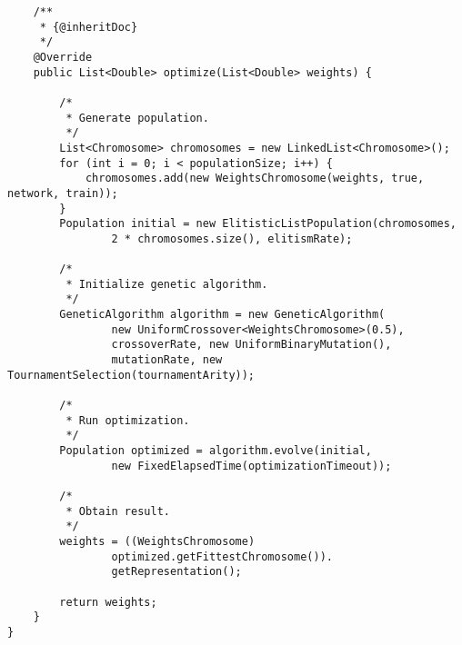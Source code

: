 \begin{verbatim}
    /**
     * {@inheritDoc}
     */
    @Override
    public List<Double> optimize(List<Double> weights) {

        /*
         * Generate population.
         */
        List<Chromosome> chromosomes = new LinkedList<Chromosome>();
        for (int i = 0; i < populationSize; i++) {
            chromosomes.add(new WeightsChromosome(weights, true, network, train));
        }
        Population initial = new ElitisticListPopulation(chromosomes,
                2 * chromosomes.size(), elitismRate);

        /*
         * Initialize genetic algorithm.
         */
        GeneticAlgorithm algorithm = new GeneticAlgorithm(
                new UniformCrossover<WeightsChromosome>(0.5),
                crossoverRate, new UniformBinaryMutation(),
                mutationRate, new TournamentSelection(tournamentArity));

        /*
         * Run optimization.
         */
        Population optimized = algorithm.evolve(initial,
                new FixedElapsedTime(optimizationTimeout));

        /*
         * Obtain result.
         */
        weights = ((WeightsChromosome)
                optimized.getFittestChromosome()).
                getRepresentation();

        return weights;
    }
}
\end{verbatim}

